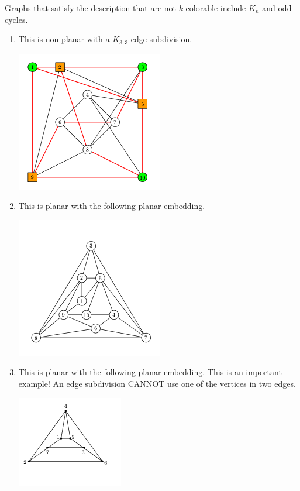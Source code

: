 \begin{enumerate}
    Graphs that satisfy the description that are not $k$-colorable include $K_n$ and odd cycles. 

   
    \begin{enumerate}
        \item This is non-planar with a $K_{3,3}$ edge subdivision.
        \begin{center}
        \includegraphics[scale=0.5]{t10q4sol1.png}
        \end{center}
        \item This is planar with the following planar embedding.
        \begin{center}
        \includegraphics[scale=0.5]{t10q4sol2.png}
        \end{center}
        \item This is planar with the following planar embedding. This is an important example! An edge subdivision CANNOT use one of the vertices in two edges.
        \begin{center}
        \includegraphics[scale=0.5]{t10q4sol3.png}
        \end{center}
    \end{enumerate}
\end{enumerate}